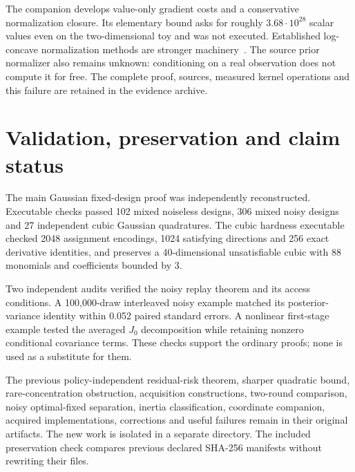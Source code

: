 \documentclass[11pt]{article}
\begin{document}
The companion develops value-only gradient costs and a conservative normalization closure. Its elementary bound asks for roughly $3.68\cdot10^{28}$ scalar values even on the two-dimensional toy and was not executed. Established log-concave normalization methods are stronger machinery~\cite{ge}. The source prior normalizer also remains unknown: conditioning on a real observation does not compute it for free. The complete proof, sources, measured kernel operations and this failure are retained in the evidence archive.

\section{Validation, preservation and claim status}

The main Gaussian fixed-design proof was independently reconstructed. Executable checks passed 102 mixed noiseless designs, 306 mixed noisy designs and 27 independent cubic Gaussian quadratures. The cubic hardness executable checked 2048 assignment encodings, 1024 satisfying directions and 256 exact derivative identities, and preserves a 40-dimensional unsatisfiable cubic with 88 monomials and coefficients bounded by 3.

Two independent audits verified the noisy replay theorem and its access conditions. A 100,000-draw interleaved noisy example matched its posterior-variance identity within 0.052 paired standard errors. A nonlinear first-stage example tested the averaged $J_0$ decomposition while retaining nonzero conditional covariance terms. These checks support the ordinary proofs; none is used as a substitute for them.

The previous policy-independent residual-risk theorem, sharper quadratic bound, rare-concentration obstruction, acquisition constructions, two-round comparison, noisy optimal-fixed separation, inertia classification, coordinate companion, acquired implementations, corrections and useful failures remain in their original artifacts. The new work is isolated in a separate directory. The included preservation check compares previous declared SHA-256 manifests without rewriting their files.
\end{document}
